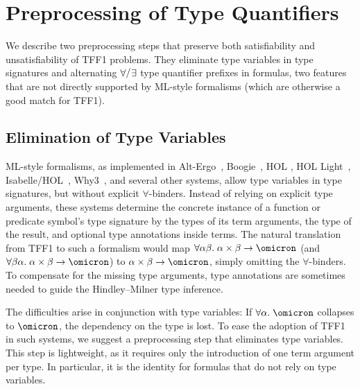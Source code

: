 \section{Preprocessing of Type Quantifiers}
\label{sec_preproc}

We describe two preprocessing steps that preserve both satisfiability and
unsatisfiability of TFF1 problems. They eliminate \theghost{} type variables in type
signatures and alternating $\forall\raise.15ex\hbox{\ensuremath{\slash}}\vthinspace\exists$ type quantifier prefixes in
formulas, two features that are not directly supported by ML-style formalisms
(which are otherwise a good match for TFF1).

\subsection{Elimination of \theGhost{} Type Variables} \label{ssec:ghost}

ML-style formalisms, as implemented in Alt-Ergo~\cite{bobot-et-al-2008},
Boogie~\cite{leino-ruemmer-2010}, HOL \cite{gordon-melham-1993}, HOL
Light~\cite{harrison-1996}, Isabelle\slash HOL~\cite{nipkow-et-al-2002},
Why3~\cite{bobot-et-al-2011}, and several other systems, allow type variables
in type signatures, but without explicit $\forall$-binders.
Instead of relying on explicit type arguments, these systems determine the
concrete instance of a function or predicate symbol's type signature by the
types of its term arguments, the type of the result, and optional type
annotations inside terms.
%
The natural translation from TFF1 to such a formalism would map $\forall
\alpha\beta.\; \alpha\times\beta\to\omicron$ (and $\forall \beta\alpha.\;
\alpha\times\beta\to\omicron$) to $\alpha\times\beta\to\omicron$, simply
omitting the $\forall$-binders. To compensate for the missing type arguments,
type annotations are sometimes needed to guide the Hindley--Milner type
inference.

The difficulties arise in conjunction with \theghost{} type variables: If
$\forall\alpha.\;\omicron$ collapses to $\omicron$, the dependency on the type
is lost.
%
To ease the adoption of TFF1 in such systems, we suggest a preprocessing step
that eliminates \theghost{} type variables. This step is lightweight, as it requires
only the introduction of one term argument per \theghost{} type. In particular,
it is the identity for formulas that do not rely on \theghost{} type variables.


